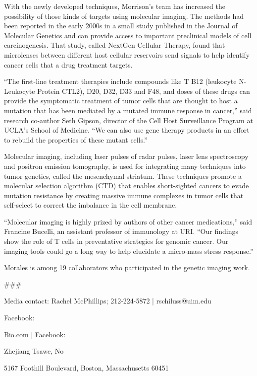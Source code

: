 \documentclass{article}
\begin{document}
With the newly developed techniques, Morrison’s team has increased the possibility of those kinds of targets using molecular imaging. The methods had been reported in the early 2000s in a small study published in the Journal of Molecular Genetics and can provide access to important preclinical models of cell carcinogenesis. That study, called NextGen Cellular Therapy, found that microlenses between different host cellular reservoirs send signals to help identify cancer cells that a drug treatment targets.

“The first-line treatment therapies include compounds like T B12 (leukocyte N-Leukocyte Protein CTL2), D20, D32, D33 and F48, and doses of these drugs can provide the symptomatic treatment of tumor cells that are thought to host a mutation that has been mediated by a mutated immune response in cancer,” said research co-author Seth Gipson, director of the Cell Host Surveillance Program at UCLA’s School of Medicine. “We can also use gene therapy products in an effort to rebuild the properties of these mutant cells.”

Molecular imaging, including laser pulses of radar pulses, laser lens spectroscopy and positron emission tomography, is used for integrating many techniques into tumor genetics, called the mesenchymal striatum. These techniques promote a molecular selection algorithm (CTD) that enables short-sighted cancers to evade mutation resistance by creating massive immune complexes in tumor cells that self-select to correct the imbalance in the cell membrane.

“Molecular imaging is highly prized by authors of other cancer medications,” said Francine Bucelli, an assistant professor of immunology at URI. “Our findings show the role of T cells in preventative strategies for genomic cancer. Our imaging tools could go a long way to help elucidate a micro-mass stress response.”

Morales is among 19 collaborators who participated in the genetic imaging work.

\#\#\#

Media contact: Rachel McPhillips; 212-224-5872 | rschiluss@uim.edu

Facebook:

Bio.com | Facebook:

Zhejiang Tsawe, No

5167 Foothill Boulevard, Boston, Massachusetts 60451
\end{document}
